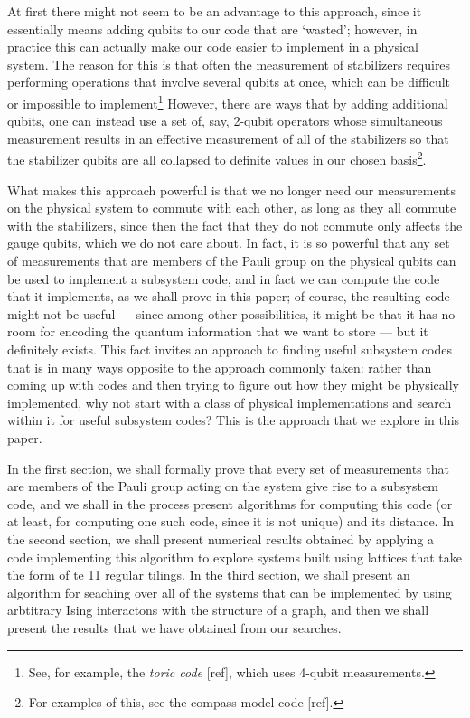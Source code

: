 \documentclass[twocolumn,showpacs,preprintnumbers,amsmath,amssymb,nofootinbib,pra,floatfix]{revtex4-1}
\begin{document}
At first there might not seem to be an advantage to this approach,
since it essentially means adding qubits to our code that are
`wasted'; however, in practice this can actually make our code easier
to implement in a physical system.  The reason for this is that often
the measurement of stabilizers requires performing operations that
involve several qubits at once, which can be difficult or impossible
to implement\footnote{See, for example, the \emph{toric code} [ref],
which uses 4-qubit measurements.}  However, there are ways that by
adding additional qubits, one can instead use a set of, say, 2-qubit
operators whose simultaneous measurement results in an effective
measurement of all of the stabilizers so that the stabilizer qubits
are all collapsed to definite values in our chosen basis\footnote{For
examples of this, see the compass model code [ref].}.

What makes this approach powerful is that we no longer need our
measurements on the physical system to commute with each other, as
long as they all commute with the stabilizers, since then the fact
that they do not commute only affects the gauge qubits, which we do
not care about.  In fact, it is so powerful that any set of
measurements that are members of the Pauli group on the physical
qubits can be used to implement a subsystem code, and in fact we can
compute the code that it implements, as we shall prove in this paper;
of course, the resulting code might not be useful --- since among
other possibilities, it might be that it has no room for encoding the
quantum information that we want to store --- but it definitely
exists.  This fact invites an approach to finding useful subsystem
codes that is in many ways opposite to the approach commonly taken:
rather than coming up with codes and then trying to figure out how
they might be physically implemented, why not start with a class of
physical implementations and search within it for useful subsystem
codes?  This is the approach that we explore in this paper.

In the first section, we shall formally prove that every set of
measurements that are members of the Pauli group acting on the system
give rise to a subsystem code, and we shall in the process present
algorithms for computing this code (or at least, for computing one
such code, since it is not unique) and its distance.  In the second
section, we shall present numerical results obtained by applying a
code implementing this algorithm to explore systems built using
lattices that take the form of te 11 regular tilings.  In the third
section, we shall present an algorithm for seaching over all of the
systems that can be implemented by using arbtitrary Ising interactons
with the structure of a graph, and then we shall present the results
that we have obtained from our searches.
\end{document}
